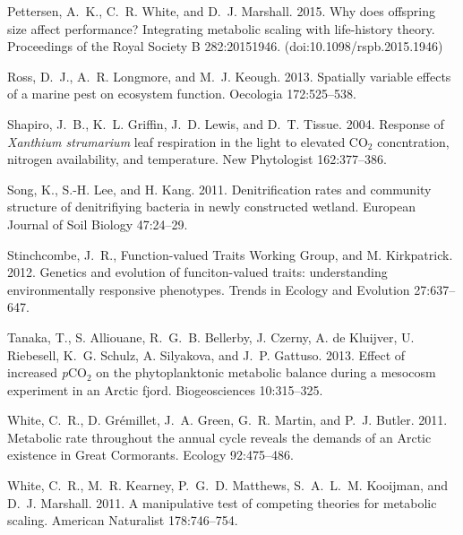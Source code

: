 \documentclass[11pt]{article}
\newcommand*\chem[1]{\ensuremath{\mathrm{#1}}}
\begin{document}
\begin{thebibliography}{}
Pettersen, A.~K., C.~R. White, and D.~J. Marshall. 2015.
\newblock Why does offspring size affect performance? Integrating metabolic scaling with life-history theory.
\newblock Proceedings of the Royal Society B 282:20151946. (doi:10.1098/rspb.2015.1946)

Ross, D.~J., A.~R. Longmore, and M.~J. Keough. 2013.
\newblock Spatially variable effects of a marine pest on ecosystem function.
\newblock Oecologia 172:525--538.

Shapiro, J.~B., K.~L. Griffin, J.~D. Lewis, and D.~T. Tissue. 2004.
\newblock Response of \textit{Xanthium strumarium} leaf respiration in the light to elevated CO$_2$ concntration, nitrogen availability, and temperature.
\newblock New Phytologist 162:377--386.

Song, K., S.-H. Lee, and H. Kang. 2011.
\newblock Denitrification rates and community structure of denitrifiying bacteria in newly constructed wetland.
\newblock European Journal of Soil Biology 47:24--29.

Stinchcombe, J.~R., Function-valued Traits Working Group, and M. Kirkpatrick. 2012.
\newblock Genetics and evolution of funciton-valued traits: understanding environmentally responsive phenotypes.
\newblock Trends in Ecology and Evolution 27:637--647.

Tanaka, T., S. Alliouane, R.~G.~B. Bellerby, J. Czerny, A. de Kluijver, U. Riebesell, K.~G. Schulz, A. Silyakova, and J.~P. Gattuso. 2013.
\newblock Effect of increased \textit{p}\chem{CO_2} on the phytoplanktonic metabolic balance during a mesocosm experiment in an Arctic fjord.
\newblock Biogeosciences 10:315--325.

White, C.~R., D. Gr\'{e}millet, J.~A. Green, G.~R. Martin, and P.~J. Butler. 2011.
\newblock Metabolic rate throughout the annual cycle reveals the demands of an Arctic existence in Great Cormorants.
\newblock Ecology 92:475--486.

White, C.~R., M.~R. Kearney, P.~G.~D. Matthews, S.~A.~L.~M. Kooijman, and D.~J. Marshall. 2011.
\newblock A manipulative test of competing theories for metabolic scaling.
\newblock American Naturalist 178:746--754.


\end{thebibliography}
\end{document}
